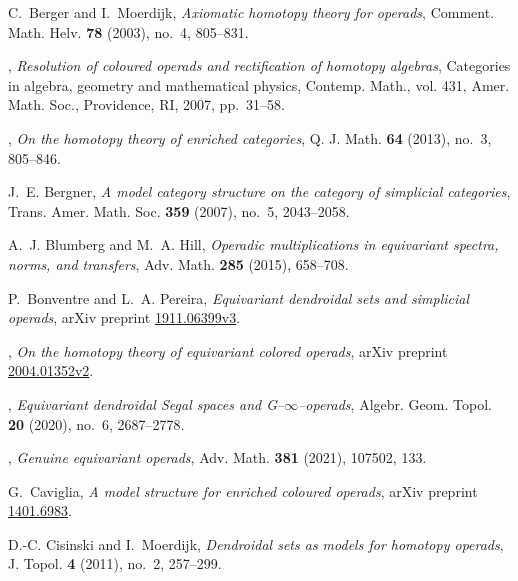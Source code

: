 \documentclass[a4paper,10pt
]{article}%
\numberwithin{equation}{section}
\numberwithin{figure}{section}
\theoremstyle{definition} %
\newcommand{\1}{\ensuremath{\mathbbm 1}}%
\begin{document}
\begin{thebibliography}{HHR16}

C.~Berger and I.~Moerdijk, \emph{Axiomatic homotopy theory for operads},
  Comment. Math. Helv. \textbf{78} (2003), no.~4, 805--831.

\bysame, \emph{Resolution of coloured operads and rectification of homotopy
  algebras}, Categories in algebra, geometry and mathematical physics, Contemp.
  Math., vol. 431, Amer. Math. Soc., Providence, RI, 2007, pp.~31--58.

\bysame, \emph{On the homotopy theory of enriched categories}, Q. J. Math.
  \textbf{64} (2013), no.~3, 805--846. 

J.~E. Bergner, \emph{A model category structure on the category of simplicial
  categories}, Trans. Amer. Math. Soc. \textbf{359} (2007), no.~5, 2043--2058.

A.~J. Blumberg and M.~A. Hill, \emph{Operadic multiplications in equivariant
  spectra, norms, and transfers}, Adv. Math. \textbf{285} (2015), 658--708.

P.~Bonventre and L.~A. Pereira, \emph{Equivariant dendroidal sets and
  simplicial operads}, arXiv preprint
  \href{https://arxiv.org/abs/1911.06399v3}{1911.06399v3}.

\bysame, \emph{On the homotopy theory of equivariant colored operads}, arXiv
  preprint \href{https://arxiv.org/abs/2004.01352v2}{2004.01352v2}.

\bysame, \emph{Equivariant dendroidal {S}egal spaces and
  {G}--{$\infty$}--operads}, Algebr. Geom. Topol. \textbf{20} (2020), no.~6,
  2687--2778. 

\bysame, \emph{Genuine equivariant operads}, Adv. Math. \textbf{381} (2021),
  107502, 133. 

G.~Caviglia, \emph{A model structure for enriched coloured operads}, arXiv
  preprint \href{https://arxiv.org/abs/1401.6983}{1401.6983}.

D.-C. Cisinski and I.~Moerdijk, \emph{Dendroidal sets as models for homotopy
  operads}, J. Topol. \textbf{4} (2011), no.~2, 257--299.


\end{thebibliography}
\end{document}
